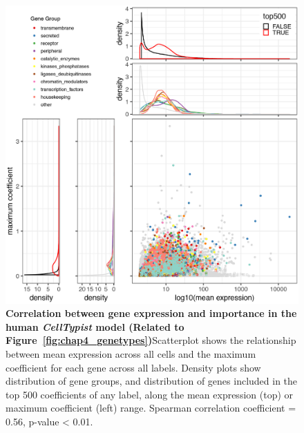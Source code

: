 \begin{figure}[ht!] 
\centering
\includegraphics[scale=0.9]{Appendix3/Figs/gene_coeff_exp_HumanAtlas.png} %
\caption[Correlation between gene expression and importance in the human \textit{CellTypist} model]{\textbf{Correlation between gene expression and importance in the human \textit{CellTypist} model (Related to Figure~\ref{fig:chap4_genetypes})}\newline Scatterplot shows the relationship between mean expression across all cells and the maximum coefficient for each gene across all labels. Density plots show distribution of gene groups, and distribution of genes included in the top 500 coefficients of any label, along the mean expression (top) or maximum coefficient (left) range. Spearman correlation coefficient = 0.56, p-value < 0.01.}
\label{fig:appB_human_coeff_exp}
\end{figure}


